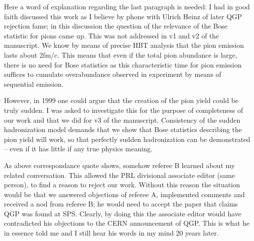 \vskip 0.5cm

Here a word of explanation regarding the last paragraph is needed: I had in good faith discussed this work as I believe by phone with Ulrich Heinz of later QGP rejection fame; in this discussion the question of the relevance of the Bose statistic\label{HeinzBose} for pions came up. This was  not addressed in v1 and v2 of the manuscript.  We  know by means of precise HBT analysis that the pion emission lasts about 2\;fm/c. This means that even if the total pion abundance is large, there is no need for Bose statistics as this characteristic time for pion emission suffices to cumulate overabundance observed in experiment by means of sequential emission. 

However, in 1999 one could argue that the creation of the pion yield could be truly sudden. I was asked to investigate this for the purpose of completeness of our work and that we did for v3 of the manuscript. Consistency of the sudden hadronization model demands  that we show that Bose statistics describing the pion yield will work, so that perfectly sudden hadronization can be demonstrated -- even if it has little if any true physics meaning.

As above correspondance quote shows, somehow referee B learned about my related conversation.  This allowed   the PRL divisional associate editor (same person), to find a reason to reject our work. Without this reason the situation would be that we answered objections of referee A, implemented comments and received a nod from referee B; he would need to accept the paper that claims QGP was found at SPS. Clearly, by doing this the associate editor would have contradicted his objections to the CERN announcement of QGP. This is what he in essence told me and I still hear his words in my mind 20 years later.\\

